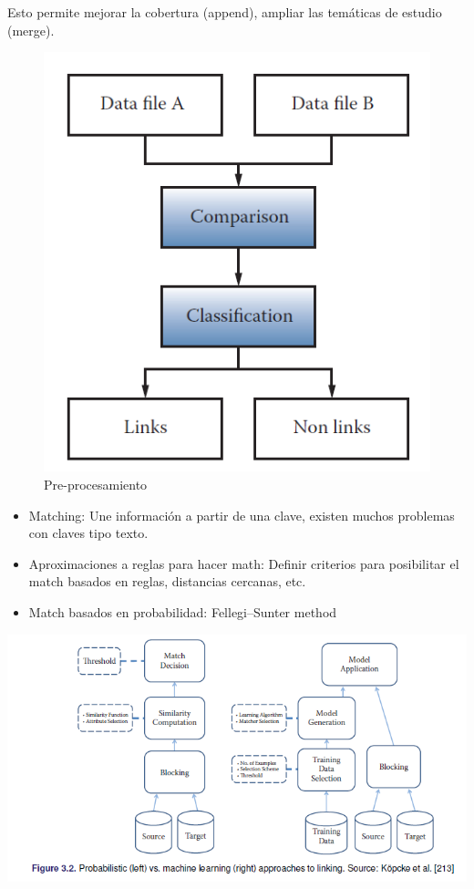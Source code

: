 \documentclass[
]{book}
\providecommand{\tightlist}{%
  \setlength{\itemsep}{0pt}\setlength{\parskip}{0pt}}
\begin{document}
Esto permite mejorar la cobertura (append), ampliar las temáticas de estudio (merge).

\begin{figure}
\centering
\includegraphics{images/bd1.png}
\caption{Pre-procesamiento}
\end{figure}

\begin{itemize}
\tightlist
\item
  Matching: Une información a partir de una clave, existen muchos problemas con claves tipo texto.
\item
  Aproximaciones a reglas para hacer math: Definir criterios para posibilitar el match basados en reglas, distancias cercanas, etc.
\item
  Match basados en probabilidad: Fellegi--Sunter method
\end{itemize}

\includegraphics{images/bd2.PNG}
\end{document}
